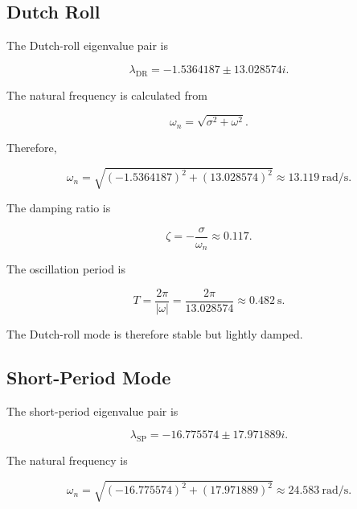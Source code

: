 \documentclass[11pt,a4paper]{article}
\begin{document}
\subsection{Dutch Roll}

The Dutch-roll eigenvalue pair is

\begin{equation}
\lambda_{\mathrm{DR}}
=
-1.5364187
\pm13.028574i.
\end{equation}

The natural frequency is calculated from

\begin{equation}
\omega_n
=
\sqrt{\sigma^2+\omega^2}.
\end{equation}

Therefore,

\begin{equation}
\omega_n
=
\sqrt{(-1.5364187)^2+(13.028574)^2}
\approx13.119~\mathrm{rad/s}.
\end{equation}

The damping ratio is

\begin{equation}
\zeta
=
-\frac{\sigma}{\omega_n}
\approx0.117.
\end{equation}

The oscillation period is

\begin{equation}
T=
\frac{2\pi}{|\omega|}
=
\frac{2\pi}{13.028574}
\approx0.482~\mathrm{s}.
\end{equation}

The Dutch-roll mode is therefore stable but lightly damped.

\subsection{Short-Period Mode}

The short-period eigenvalue pair is

\begin{equation}
\lambda_{\mathrm{SP}}
=
-16.775574
\pm17.971889i.
\end{equation}

The natural frequency is

\begin{equation}
\omega_n
=
\sqrt{(-16.775574)^2+(17.971889)^2}
\approx24.583~\mathrm{rad/s}.
\end{equation}
\end{document}
